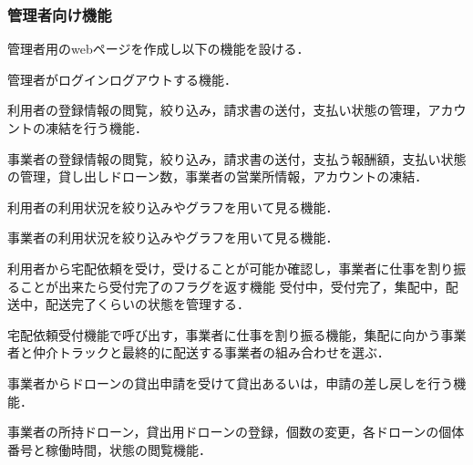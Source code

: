 \documentclass[a4paper, titlepage]{jsarticle}
\begin{document}
\subsubsection{管理者向け機能}
管理者用のwebページを作成し以下の機能を設ける．
\begin{description}[labelwidth=\linewidth]
  \setlength{\leftskip}{1em}
  \item [ログインログアウト機能]管理者がログインログアウトする機能．
  \item [利用者管理機能]利用者の登録情報の閲覧，絞り込み，請求書の送付，支払い状態の管理，アカウントの凍結を行う機能．
  \item [事業者管理機能]事業者の登録情報の閲覧，絞り込み，請求書の送付，支払う報酬額，支払い状態の管理，貸し出しドローン数，事業者の営業所情報，アカウントの凍結．
  \item [利用者情報分析機能]利用者の利用状況を絞り込みやグラフを用いて見る機能．
  \item [事業者情報分析機能]事業者の利用状況を絞り込みやグラフを用いて見る機能．
  \item [宅配依頼受付機能]利用者から宅配依頼を受け，受けることが可能か確認し，事業者に仕事を割り振ることが出来たら受付完了のフラグを返す機能 受付中，受付完了，集配中，配送中，配送完了くらいの状態を管理する．
  \item [宅配仕事割り振り機能]宅配依頼受付機能で呼び出す，事業者に仕事を割り振る機能，集配に向かう事業者と仲介トラックと最終的に配送する事業者の組み合わせを選ぶ．
  \item [ドローン貸出機能]事業者からドローンの貸出申請を受けて貸出あるいは，申請の差し戻しを行う機能．
  \item [事業者ドローン情報管理機能]事業者の所持ドローン，貸出用ドローンの登録，個数の変更，各ドローンの個体番号と稼働時間，状態の閲覧機能．
\end{description}
\end{document}
